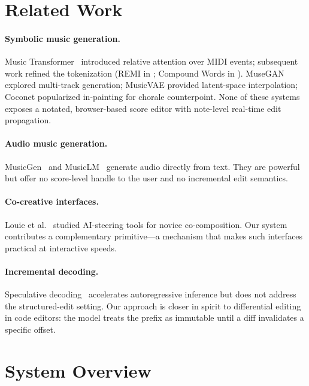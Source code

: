 \documentclass[11pt,a4paper]{article}
\begin{document}
\section{Related Work}

\paragraph{Symbolic music generation.}
Music Transformer~\cite{huang2018music} introduced relative attention
over MIDI events; subsequent work refined the tokenization (REMI in
\cite{huang2020pop}; Compound Words in \cite{hsiao2021compound}). MuseGAN
\cite{dong2018musegan} explored multi-track generation; MusicVAE
\cite{roberts2018hierarchical} provided latent-space interpolation;
Coconet \cite{huang2019counterpoint} popularized in-painting for chorale
counterpoint. None of these systems exposes a notated, browser-based
score editor with note-level real-time edit propagation.

\paragraph{Audio music generation.}
MusicGen~\cite{copet2023simple} and MusicLM~\cite{agostinelli2023musiclm}
generate audio directly from text. They are powerful but offer no
score-level handle to the user and no incremental edit semantics.

\paragraph{Co-creative interfaces.}
Louie et al.~\cite{louie2020novice} studied AI-steering tools for novice
co-composition. Our system contributes a complementary primitive---a
mechanism that makes such interfaces practical at interactive speeds.

\paragraph{Incremental decoding.}
Speculative decoding~\cite{liu2024speculative} accelerates autoregressive
inference but does not address the structured-edit setting. Our approach
is closer in spirit to differential editing in code editors: the model
treats the prefix as immutable until a diff invalidates a specific offset.

\section{System Overview}
\end{document}
